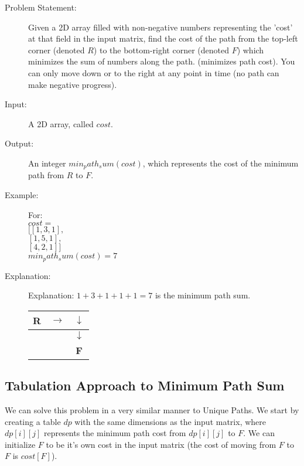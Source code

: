 \begin{description}
    \item[Problem Statement:]
        Given a 2D array filled with non-negative numbers representing the 'cost' at that field in the input matrix,
        find the cost of the path from the top-left corner (denoted $R$) to the bottom-right corner (denoted $F$) which minimizes the sum of numbers along the path.
        (minimizes path cost).
        You can only move down or to the right at any point in time (no path can make negative progress).

    \item[Input:]
        A 2D array, called $cost$.
        
    \item[Output:]
        An integer $min_path_sum(cost)$, which represents the cost of the minimum path from $R$ to $F$.
        
    \item[Example:] For:\\
    $cost = $\\
    $[[1,3,1],$\\
    $[1,5,1],$\\
    $[4,2,1]]$\\

    $min_path_sum(cost) = 7$

    \item[Explanation:]
        Explanation: $1 + 3 + 1 + 1 + 1 = 7$ is the minimum path sum.
        \begin{table}[H]
            \centering
            \begin{tabular}{|c|c|c|}
                \hline
                \textbf{R} & $\rightarrow$ & $\downarrow$ \\
                \hline
                 &  & $\downarrow$ \\
                \hline
                 &  & \textbf{F} \\
                \hline
            \end{tabular}
        \end{table}
        
\end{description}

\subsection{Tabulation Approach to Minimum Path Sum}
We can solve this problem in a very similar manner to Unique Paths.
We start by creating a table $dp$ with the same dimensions as the input matrix, where $dp[i][j]$ represents the minimum path cost from $dp[i][j]$ to $F$.
We can initialize $F$ to be it's own cost in the input matrix (the cost of moving from $F$ to $F$ is $cost[F]$).

